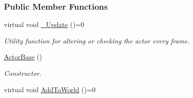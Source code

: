 \subsubsection*{Public Member Functions}
\begin{DoxyCompactItemize}
\item 
\hypertarget{classMezzanine_1_1ActorBase_a8f5a36a6981f1249dbabab318531afd0}{
virtual void \hyperlink{classMezzanine_1_1ActorBase_a8f5a36a6981f1249dbabab318531afd0}{\_\-Update} ()=0}
\label{classMezzanine_1_1ActorBase_a8f5a36a6981f1249dbabab318531afd0}

\begin{DoxyCompactList}\small\item\em Utility function for altering or checking the actor every frame. \item\end{DoxyCompactList}\item 
\hyperlink{classMezzanine_1_1ActorBase_aa9cc2fce1ff708a96d4a879b87054f18}{ActorBase} ()
\begin{DoxyCompactList}\small\item\em Constructor. \item\end{DoxyCompactList}\item 
\hypertarget{classMezzanine_1_1ActorBase_abe739a46f248a7ba257becfb560d9aa5}{
virtual void \hyperlink{classMezzanine_1_1ActorBase_abe739a46f248a7ba257becfb560d9aa5}{AddToWorld} ()=0}
\label{classMezzanine_1_1ActorBase_abe739a46f248a7ba257becfb560d9aa5}


\end{DoxyCompactItemize}
